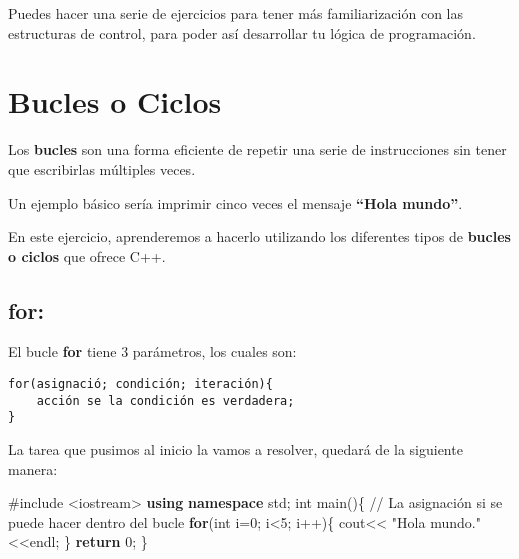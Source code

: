 \documentclass[
  11pt,
  a4paper,
  DIV=11,
  numbers=noendperiod]{scrreprt}
\newenvironment{Shaded}{\begin{snugshade}}{\end{snugshade}}
\newcommand{\CommentTok}[1]{\textcolor[rgb]{0.37,0.37,0.37}{#1}}
\newcommand{\ControlFlowTok}[1]{\textcolor[rgb]{0.00,0.23,0.31}{\textbf{#1}}}
\newcommand{\DataTypeTok}[1]{\textcolor[rgb]{0.68,0.00,0.00}{#1}}
\newcommand{\DecValTok}[1]{\textcolor[rgb]{0.68,0.00,0.00}{#1}}
\newcommand{\ImportTok}[1]{\textcolor[rgb]{0.00,0.46,0.62}{#1}}
\newcommand{\KeywordTok}[1]{\textcolor[rgb]{0.00,0.23,0.31}{\textbf{#1}}}
\newcommand{\NormalTok}[1]{\textcolor[rgb]{0.00,0.23,0.31}{#1}}
\newcommand{\OperatorTok}[1]{\textcolor[rgb]{0.37,0.37,0.37}{#1}}
\newcommand{\PreprocessorTok}[1]{\textcolor[rgb]{0.68,0.00,0.00}{#1}}
\newcommand{\StringTok}[1]{\textcolor[rgb]{0.13,0.47,0.30}{#1}}
\begin{document}
Puedes hacer una serie de ejercicios para tener más familiarización con
las estructuras de control, para poder así desarrollar tu lógica de
programación.


\chapter{Bucles o Ciclos}\label{bucles-o-ciclos}

Los \textbf{bucles} son una forma eficiente de repetir una serie de
instrucciones sin tener que escribirlas múltiples veces.

Un ejemplo básico sería imprimir cinco veces el mensaje \textbf{``Hola
mundo''}.

En este ejercicio, aprenderemos a hacerlo utilizando los diferentes
tipos de \textbf{bucles o ciclos} que ofrece C++.

\section{for:}\label{for}

El bucle \textbf{for} tiene 3 parámetros, los cuales son:

\begin{tcolorbox}[custombox]
\begin{verbatim}
for(asignació; condición; iteración){ 
    acción se la condición es verdadera; 
}
\end{verbatim}
\end{tcolorbox}

La tarea que pusimos al inicio la vamos a resolver, quedará de la
siguiente manera:

\begin{Shaded}
\begin{Highlighting}[]
\PreprocessorTok{\#include }\ImportTok{\textless{}iostream\textgreater{}}
\KeywordTok{using} \KeywordTok{namespace}\NormalTok{ std}\OperatorTok{;}
\DataTypeTok{int}\NormalTok{ main}\OperatorTok{()\{}
  \CommentTok{// La asignación si se puede hacer dentro del bucle}
    \ControlFlowTok{for}\OperatorTok{(}\DataTypeTok{int}\NormalTok{ i}\OperatorTok{=}\DecValTok{0}\OperatorTok{;}\NormalTok{ i}\OperatorTok{\textless{}}\DecValTok{5}\OperatorTok{;}\NormalTok{ i}\OperatorTok{++)\{} 
\NormalTok{        cout}\OperatorTok{\textless{}\textless{}} \StringTok{"Hola mundo."}\OperatorTok{\textless{}\textless{}}\NormalTok{endl}\OperatorTok{;}
    \OperatorTok{\}}
    \ControlFlowTok{return} \DecValTok{0}\OperatorTok{;}
\OperatorTok{\}}
\end{Highlighting}
\end{Shaded}
\end{document}
